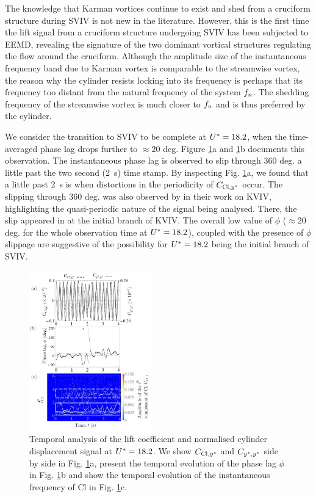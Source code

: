 \documentclass[a4paper,fleqn]{cas-sc}
\begin{document}
The knowledge that Karman vortices continue to exist and shed from a cruciform structure during SVIV is not new in the literature. However, this is the first time the lift signal from a cruciform structure undergoing SVIV has been subjected to EEMD, revealing the signature of the two dominant vortical structures regulating the flow around the cruciform. Although the amplitude size of the instantaneous frequency band due to Karman vortex is comparable to the streamwise vortex, the reason why the cylinder resists locking into its frequency is perhaps that its frequency too distant from the natural frequency of the system $f_{n}$. The shedding frequency of the streamwise vortex is much closer to $f_{n}$ and is thus preferred by the cylinder.

We consider the transition to SVIV to be complete at $U^{*} = 18.2$, when the time-averaged phase lag drops further to $\approx 20$ deg. Figure \ref{fig:tempAnalysisStableInitialBranch}a and \ref{fig:tempAnalysisStableInitialBranch}b documents this observation. The instantaneous phase lag is observed to slip through 360 deg. a little past the two second (\SI{2}{\second}) time stamp. By inspecting Fig. \ref{fig:tempAnalysisStableInitialBranch}a, we found that a little past \SI{2}{\second} is when distortions in the periodicity of $C_{\text{Cl},y^{*}}$ occur. The slipping through 360 deg. was also observed by \citet{Khalak1999} in their work on KVIV, highlighting the quasi-periodic nature of the signal being analysed. There, the slip appeared in \citet{Khalak1999} at the initial branch of KVIV. The overall low value of $\phi$ ($\approx 20$ deg. for the whole observation time at $U^{*} = 18.2$), coupled with the presence of $\phi$ slippage are suggestive of the possibility for $U^{*} = 18.2$ being the initial branch of SVIV.

\begin{figure}
  \centering
  \includegraphics[width=0.47\textwidth]{figs/figure17}
  \caption{Temporal analysis of the lift coefficient and normalised cylinder displacement signal at $U^{*} = 18.2$. We show $C_{\text{Cl},y^{*}}$ and $C_{y^{*},y^{*}}$ side by side in Fig. \ref{fig:tempAnalysisStableInitialBranch}a, present the temporal evolution of the phase lag $\phi$ in Fig. \ref{fig:tempAnalysisStableInitialBranch}b and show the temporal evolution of the instantaneous frequency of Cl in Fig. \ref{fig:tempAnalysisStableInitialBranch}c.}
  \label{fig:tempAnalysisStableInitialBranch}
\end{figure}
\end{document}
